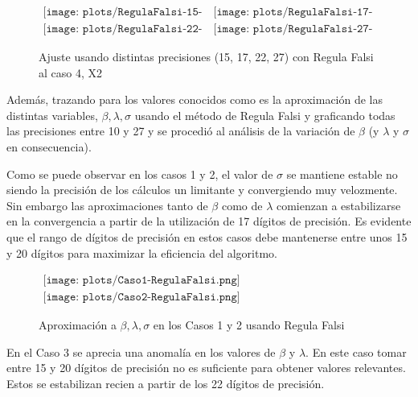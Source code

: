 \begin{figure} [H]
$\begin{array}{cc}
\texttt{[image: plots/RegulaFalsi-15-caso4.png]} &
\texttt{[image: plots/RegulaFalsi-17-caso4.png]} \\
\texttt{[image: plots/RegulaFalsi-22-caso4.png]} &
\texttt{[image: plots/RegulaFalsi-27-caso4.png]}
\end{array}$
\caption{Ajuste usando distintas precisiones (15, 17, 22, 27) con Regula 
Falsi al caso 4, X2}
\label{fig:FitCaso4Newton}
\end{figure}


Adem\'as, trazando para los valores conocidos como es la aproximaci\'on de las 
distintas variables, $\beta, \lambda, \sigma$ usando el m\'etodo de Regula Falsi
y graficando todas las precisiones entre 10 y 27 y se procedi\'o al an\'alisis de
la variaci\'on de $\beta$ (y $\lambda$ y $\sigma$ en consecuencia).

Como se puede observar en los casos 1 y 2, el valor de $\sigma$ se mantiene 
estable no siendo la precisi\'on de los c\'alculos un limitante y convergiendo 
muy velozmente. Sin embargo las aproximaciones tanto de $\beta$ como de $\lambda$ 
comienzan a estabilizarse en la convergencia a partir de la utilizaci\'on de 17 
d\'igitos de precisi\'on. Es evidente que el rango de d\'igitos de precisi\'on en 
estos casos debe mantenerse entre unos 15 y 20 d\'igitos para maximizar la 
eficiencia del algoritmo.  

\begin{figure}
$\begin{array}{c}
\texttt{[image: plots/Caso1-RegulaFalsi.png]} \\
\texttt{[image: plots/Caso2-RegulaFalsi.png]}
\end{array}$

\caption{Aproximaci\'on a $\beta, \lambda, \sigma$ en los Casos 1 y 2 usando 
Regula Falsi}
\end{figure}

En el Caso 3 se aprecia una anomal\'ia en los valores de $\beta$ y $\lambda$.
En este caso tomar entre 15 y 20 d\'igitos de precisi\'on no es suficiente para 
obtener valores relevantes. Estos se estabilizan recien a partir de los 22 
d\'igitos de precisi\'on.

